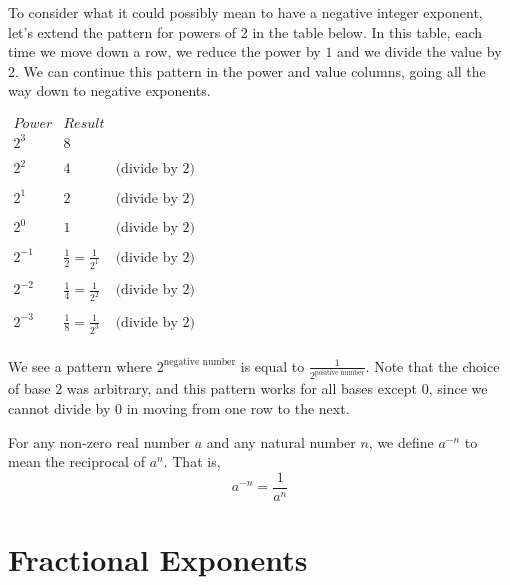 \documentclass{ximera}
\begin{document}
        To consider what it could possibly mean to have a negative integer exponent,
        let's extend the pattern for powers of 2 in the table below.
        In this table, each time we move down a row,
        we reduce the power by $1$ and we divide the value by $2$.
        We can continue this pattern in the power and value columns,
        going all the way down to negative exponents.
%
\begin{center}
$
  \begin{array}{ccc}
            Power & Result & \\
        \hline
            2^3 & 8 & \\
\\
              2^2 & 4 & \text{(divide by 2)} \\
\\
               2^1 & 2 & \text{(divide by 2)} \\
\\
                     2^0 & 1 & \text{(divide by 2)} \\
\\
           2^{-1} & \frac{1}{2}=\frac{1}{2^1} & \text{(divide by 2)} \\   
\\       
           2^{-2} & \frac{1}{4}=\frac{1}{2^2} & \text{(divide by 2)} \\
\\
                   2^{-3} & \frac{1}{8}=\frac{1}{2^3} & \text{(divide by 2)} \\          
     \end{array}
$
\end{center}

  We see a pattern where $2^{\text{negative number}}$ is equal to $\frac{1}{2^{\text{positive number}}}$.
      Note that the choice of base $2$ was arbitrary,
      and this pattern works for all bases except $0$,
      since we cannot divide by $0$ in moving from one row to the next.

\begin{theorem}
          For any non-zero real number $a$ and any natural number $n$,
          we define $a^{-n}$ to mean the reciprocal of $a^n$. That is,
$$      
 a^{-n} = \frac{1}{a^n}
   $$
     
    \end{theorem}
    
    \section{Fractional Exponents}
    
\end{document}
